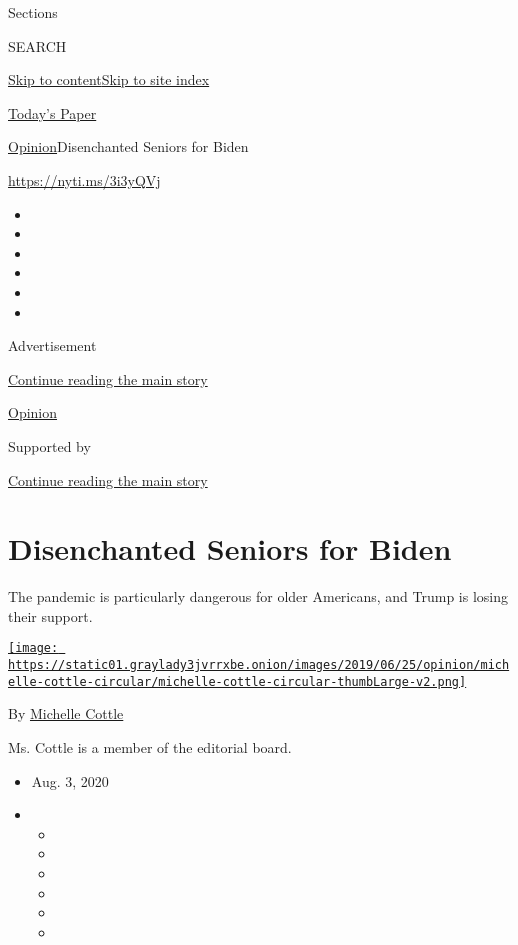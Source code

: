 Sections

SEARCH

\protect\hyperlink{site-content}{Skip to
content}\protect\hyperlink{site-index}{Skip to site index}

\href{https://myaccount.nytimes3xbfgragh.onion/auth/login?response_type=cookie\&client_id=vi}{}

\href{https://www.nytimes3xbfgragh.onion/section/todayspaper}{Today's
Paper}

\href{/section/opinion}{Opinion}\textbar{}Disenchanted Seniors for Biden

\url{https://nyti.ms/3i3yQVj}

\begin{itemize}
\item
\item
\item
\item
\item
\item
\end{itemize}

Advertisement

\protect\hyperlink{after-top}{Continue reading the main story}

\href{/section/opinion}{Opinion}

Supported by

\protect\hyperlink{after-sponsor}{Continue reading the main story}

\hypertarget{disenchanted-seniors-for-biden}{%
\section{Disenchanted Seniors for
Biden}\label{disenchanted-seniors-for-biden}}

The pandemic is particularly dangerous for older Americans, and Trump is
losing their support.

\href{https://www.nytimes3xbfgragh.onion/by/michelle-cottle}{\texttt{[image: https://static01.graylady3jvrrxbe.onion/images/2019/06/25/opinion/michelle-cottle-circular/michelle-cottle-circular-thumbLarge-v2.png]}}

By \href{https://www.nytimes3xbfgragh.onion/by/michelle-cottle}{Michelle
Cottle}

Ms. Cottle is a member of the editorial board.

\begin{itemize}
\item
  Aug. 3, 2020
\item
  \begin{itemize}
  \item
  \item
  \item
  \item
  \item
  \item
  \end{itemize}
\end{itemize}

